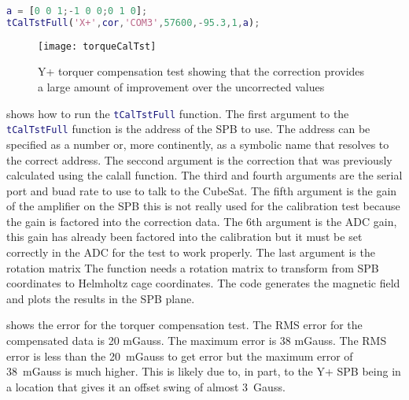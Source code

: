 \begin{lstlisting}[style=code,caption={Running torquer compensation test for the X+ \ac{SPB}},label={lst:tCalTst},language=Matlab]
a = [0 0 1;-1 0 0;0 1 0];
tCalTstFull('X+',cor,'COM3',57600,-95.3,1,a);
\end{lstlisting}

\begin{figure}[!ht]
    \centering
    \texttt{[image: torqueCalTst]}
  \caption{Y+ torquer compensation test showing that the correction provides a large amount of improvement over the uncorrected values}
    \label{fig:tqtst}
\end{figure}

 shows how to run the \lstinline[style=code,language=Matlab]$tCalTstFull$ function. The first argument to the \lstinline[style=code,language=Matlab]$tCalTstFull$ function is the address of the \ac{SPB} to use. The address can be specified as a number or, more continently, as a symbolic name that resolves to the correct address. The seccond argument is the correction that was previously calculated using the calall function. The third and fourth arguments are the serial port and buad rate to use to talk to the CubeSat. The fifth argument is the gain of the amplifier on the \ac{SPB} this is not really used for the calibration test because the gain is factored into the correction data. The 6th argument is the \ac{ADC} gain, this gain has already been factored into the calibration but it must be set correctly in the \ac{ADC} for the test to work properly. The last argument is the rotation matrix  The function needs a rotation matrix to transform from \ac{SPB} coordinates to Helmholtz cage coordinates. The code generates the magnetic field and plots the results in the \ac{SPB} plane.


 shows the error for the torquer compensation test. The RMS error for the compensated data is 20 mGauss. The maximum error is 38 mGauss. The RMS error is less than the 20~mGauss to get {\textdegree} error but the maximum error of 38~mGauss is much higher. This is likely due to, in part, to the Y+ \ac{SPB} being in a location that gives it an offset swing of almost 3~Gauss.

